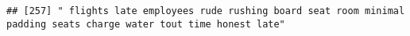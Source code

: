 \documentclass[
]{article}
\begin{document}
\begin{verbatim}
## [257] " flights late employees rude rushing board seat room minimal padding seats charge water tout time honest late"                                                                                                                                                                                                                                                                                                                                                                                                                                                                                                                                                                                                                                                                                                                                                                                                                                                                                                                                                                                                                                                                                                                                                                                                                                                                                                                                                                                                                                                                                                                                                                                                                                                                                 

\end{verbatim}
\end{document}
